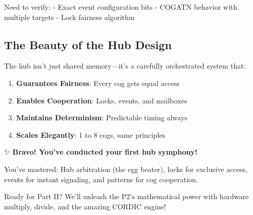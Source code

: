 \documentclass[11pt]{book}
\providecommand{\tightlist}{%
  \setlength{\itemsep}{0pt}\setlength{\parskip}{0pt}}
\begin{document}
\begin{review}
Need to verify:
- Exact event configuration bits
- COGATN behavior with multiple targets
- Lock fairness algorithm
\end{review}

\hypertarget{the-beauty-of-the-hub-design}{%
\subsection{The Beauty of the Hub
Design}\label{the-beauty-of-the-hub-design}}

The hub isn't just shared memory---it's a carefully orchestrated system
that:

\begin{enumerate}
\def\labelenumi{\arabic{enumi}.}
\tightlist
\item
  \textbf{Guarantees Fairness}: Every cog gets equal access
\item
  \textbf{Enables Cooperation}: Locks, events, and mailboxes
\item
  \textbf{Maintains Determinism}: Predictable timing always
\item
  \textbf{Scales Elegantly}: 1 to 8 cogs, same principles
\end{enumerate}

\begin{chapterend}
✨ \textbf{Bravo! You've conducted your first hub symphony!}

You've mastered: Hub arbitration (the egg beater), locks for exclusive access, events for instant signaling, and patterns for cog cooperation.

Ready for Part II? We'll unleash the P2's mathematical power with hardware multiply, divide, and the amazing CORDIC engine!
\end{chapterend}

\printindex
\end{document}
